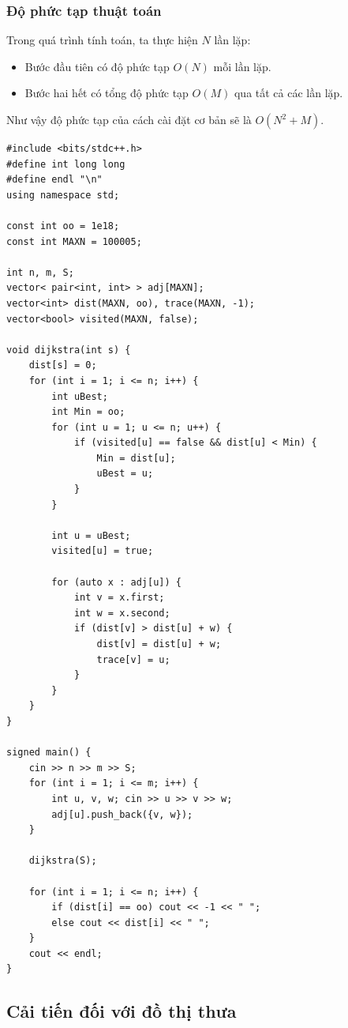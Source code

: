 \documentclass{article}
\begin{document}
\subsubsection*{Độ phức tạp thuật toán}

Trong quá trình tính toán, ta thực hiện $N$ lần lặp:
\begin{itemize}
    \item Bước đầu tiên có độ phức tạp $O(N)$ mỗi lần lặp.
    \item Bước hai hết có tổng độ phức tạp $O(M)$ qua tất cả các lần lặp.
\end{itemize}

Như vậy độ phức tạp của cách cài đặt cơ bản sẽ là $O(N^2 + M)$.

\begin{lstlisting}
#include <bits/stdc++.h>
#define int long long
#define endl "\n"
using namespace std;

const int oo = 1e18;
const int MAXN = 100005;

int n, m, S;
vector< pair<int, int> > adj[MAXN];
vector<int> dist(MAXN, oo), trace(MAXN, -1);
vector<bool> visited(MAXN, false);

void dijkstra(int s) {
    dist[s] = 0;
    for (int i = 1; i <= n; i++) {
        int uBest;
        int Min = oo;
        for (int u = 1; u <= n; u++) {
            if (visited[u] == false && dist[u] < Min) {
                Min = dist[u];
                uBest = u;
            }
        }

        int u = uBest;
        visited[u] = true;

        for (auto x : adj[u]) {
            int v = x.first;
            int w = x.second;
            if (dist[v] > dist[u] + w) {
                dist[v] = dist[u] + w;
                trace[v] = u;
            }
        }
    }
}

signed main() {
    cin >> n >> m >> S;
    for (int i = 1; i <= m; i++) {
        int u, v, w; cin >> u >> v >> w;
        adj[u].push_back({v, w});
    }

    dijkstra(S);

    for (int i = 1; i <= n; i++) {
        if (dist[i] == oo) cout << -1 << " ";
        else cout << dist[i] << " ";
    }
    cout << endl;
}
\end{lstlisting}

\subsection*{Cải tiến đối với đồ thị thưa}
\end{document}
